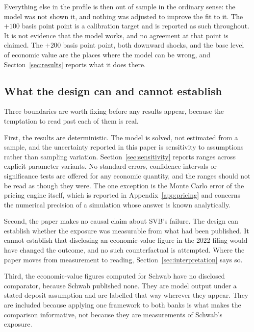 Everything else in the profile is then out of sample in the ordinary sense: the
model was not shown it, and nothing was adjusted to improve the fit to it. The
$+100$ basis point point is a calibration target and is reported as such
throughout. It is not evidence that the model works, and no agreement at that
point is claimed. The $+200$ basis point point, both downward shocks, and the
base level of economic value are the places where the model can be wrong, and
Section~\ref{sec:results} reports what it does there.

\subsection{What the design can and cannot establish}

Three boundaries are worth fixing before any results appear, because the
temptation to read past each of them is real.

First, the results are deterministic. The model is solved, not estimated from a
sample, and the uncertainty reported in this paper is sensitivity to assumptions
rather than sampling variation. Section~\ref{sec:sensitivity} reports ranges
across explicit parameter variants. No standard errors, confidence intervals or
significance tests are offered for any economic quantity, and the ranges should
not be read as though they were. The one exception is the Monte Carlo error of the
pricing engine itself, which is reported in Appendix~\ref{app:pricing} and
concerns the numerical precision of a simulation whose answer is known
analytically.

Second, the paper makes no causal claim about SVB's failure. The design can
establish whether the exposure was measurable from what had been published. It
cannot establish that disclosing an economic-value figure in the 2022 filing
would have changed the outcome, and no such counterfactual is attempted. Where
the paper moves from measurement to reading, Section~\ref{sec:interpretation}
says so.

Third, the economic-value figures computed for Schwab have no disclosed
comparator, because Schwab published none. They are model output under a stated
deposit assumption and are labelled that way wherever they appear. They are
included because applying one framework to both banks is what makes the
comparison informative, not because they are measurements of Schwab's exposure.
